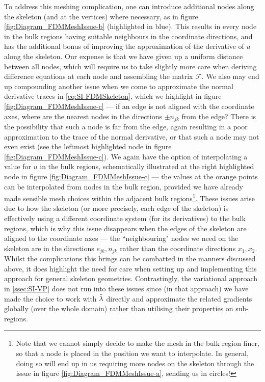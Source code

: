 To address this meshing complication, one can introduce additional nodes along the skeleton (and at the vertices) where necessary, as in figure \ref{fig:Diagram_FDMMeshIssue-b} (highlighted in blue).
This results in every node in the bulk regions having suitable neighbours in the coordinate directions, and has the additional bonus of improving the approximation of the derivative of $u$ along the skeleton.
Our expense is that we have given up a uniform distance between all nodes, which will require us to take slightly more care when deriving difference equations at each node and assembling the matrix $\mathcal{F}$.
We also may end up compounding another issue when we come to approximate the normal derivative traces in \eqref{eq:SI-FDMSkeleton}, which we highlight in figure \ref{fig:Diagram_FDMMeshIssue-c} --- if an edge is not aligned with the coordinate axes, where are the nearest nodes in the directions $\pm n_{jk}$ from the edge?
There is the possibility that such a node is far from the edge, again resulting in a poor approximation to the trace of the normal derivative, or that such a node may not even exist (see the leftmost highlighted node in figure \ref{fig:Diagram_FDMMeshIssue-c}).
We again have the option of interpolating a value for $u$ in the bulk regions, schematically illustrated at the right highlighted node in figure \ref{fig:Diagram_FDMMeshIssue-c} --- the values at the orange points can be interpolated from nodes in the bulk region, provided we have already made sensible mesh choices within the adjacent bulk regions\footnote{Note that we cannot simply decide to make the mesh in the bulk region finer, so that a node is placed in the position we want to interpolate. In general, doing so will end up in us requiring more nodes on the skeleton through the issue in figure \ref{fig:Diagram_FDMMeshIssue-a}, sending us in circles!}.
These issues arise due to how the skeleton (or more precisely, each edge of the skeleton) is effectively using a different coordinate system (for its derivatives) to the bulk regions, which is why this issue disappears when the edges of the skeleton are aligned to the coordinate axes --- the ``neighbouring" nodes we need on the skeleton are in the directions $e_{jk}, n_{jk}$ rather than the coordinate directions $x_1, x_2$.
Whilst the complications this brings can be combatted in the manners discussed above, it does highlight the need for care when setting up and implementing this approach for general skeleton geometries.
Contrastingly, the variational approach in \ref{ssec:SI-VP} does not run into these issues since (in that approach) we have made the choice to work with $\tilde{\lambda}$ directly and approximate the related gradients globally (over the whole domain) rather than utilising their properties on sub-regions.

